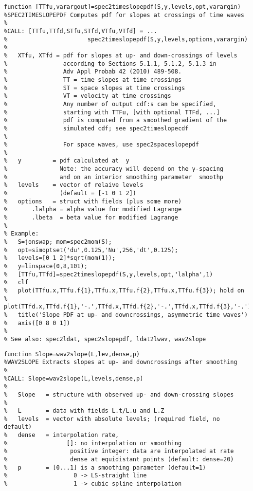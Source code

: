 {\begin{verbatim}
function [TTfu,varargout]=spec2timeslopepdf(S,y,levels,opt,varargin) 
%SPEC2TIMESLOPEPDF Computes pdf for slopes at crossings of time waves 
%
%CALL: [TTfu,TTfd,STfu,STfd,VTfu,VTfd] = ... 
%                       spec2timeslopepdf(S,y,levels,options,varargin)
%
%   XTfu, XTfd = pdf for slopes at up- and down-crossings of levels 
%                according to Sections 5.1.1, 5.1.2, 5.1.3 in 
%                Adv Appl Probab 42 (2010) 489-508. 
%                TT = time slopes at time crossings
%                ST = space slopes at time crossings
%                VT = velocity at time crossings
%                Any number of output cdf:s can be specified, 
%                starting with TTFu, [with optional TTFd, ...]      
%                pdf is computed from a smoothed gradient of the
%                simulated cdf; see spec2timeslopecdf 
%
%                For space waves, use spec2spaceslopepdf 
%
%   y         = pdf calculated at  y
%               Note: the accuracy will depend on the y-spacing
%               and on an interior smoothing parameter  smoothp  
%   levels    = vector of relaive levels 
%               (default = [-1 0 1 2])
%   options   = struct with fields (plus some more)
%       .lalpha = alpha value for modified Lagrange
%       .lbeta  = beta value for modified Lagrange
%
% Example:
%   S=jonswap; mom=spec2mom(S);
%   opt=simoptset('du',0.125,'Nu',256,'dt',0.125);
%   levels=[0 1 2]*sqrt(mom(1));
%   y=linspace(0,8,101);
%   [TTfu,TTfd]=spec2timeslopepdf(S,y,levels,opt,'lalpha',1)
%   clf
%   plot(TTfu.x,TTfu.f{1},TTfu.x,TTfu.f{2},TTfu.x,TTfu.f{3}); hold on
%   plot(TTfd.x,TTfd.f{1},'-.',TTfd.x,TTfd.f{2},'-.',TTfd.x,TTfd.f{3},'-.')
%   title('Slope PDF at up- and downcrossings, asymmetric time waves')
%   axis([0 8 0 1])
%
% See also: spec2ldat, spec2slopepdf, ldat2lwav, wav2slope
\end{verbatim}
\clearpage

\begin{verbatim}
function Slope=wav2slope(L,lev,dense,p)
%WAV2SLOPE Extracts slopes at up- and downcrossings after smoothing
%
%CALL: Slope=wav2slope(L,levels,dense,p)
%
%   Slope   = structure with observed up- and down-crossing slopes
%       
%   L       = data with fields L.t/L.u and L.Z
%   levels  = vector with absolute levels; (required field, no default)
%   dense   = interpolation rate,
%                 []: no interpolation or smoothing
%                  positive integer: data are interpolated at rate
%                  dense at equidistant points (default: dense=20)
%   p       = [0...1] is a smoothing parameter (default=1)
%                   0 -> LS-straight line
%                   1 -> cubic spline interpolation
\end{verbatim}
}


